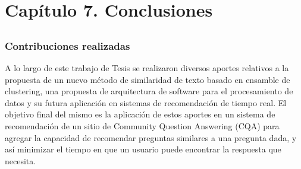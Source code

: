 \chapter*{Capítulo 7. \textbf{Conclusiones}}\label{ch:conclusiones}

\section*{}
\addtocounter{section}{1}
\setcounter{subsection}{0}

\subsection{Contribuciones realizadas}
A lo largo de este trabajo de Tesis se realizaron diversos aportes relativos a la propuesta de un nuevo método de similaridad de texto basado en ensamble de clustering, una propuesta de arquitectura de software para el procesamiento de datos y su futura aplicación en sistemas de recomendación de tiempo real. El objetivo final del mismo es la aplicación de estos aportes en un sistema de recomendación de un sitio de Community Question Answering (CQA) para agregar la capacidad de recomendar preguntas similares a una pregunta dada, y así minimizar el tiempo en que un usuario puede encontrar la respuesta que necesita.

